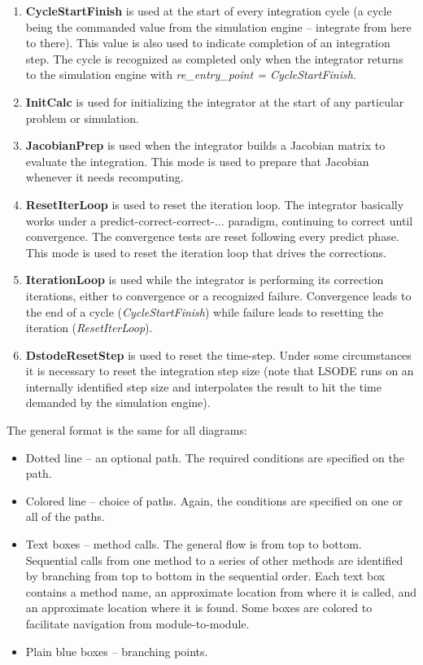 \begin{enumerate}
\item {\textbf{CycleStartFinish}} is used at the start of every integration
cycle (a
cycle being the commanded value from the simulation engine -- integrate from
here to there).  This value is also used to indicate completion of an
integration step.  The cycle is recognized as completed only when the
integrator
returns to the simulation engine with \textit{re\_entry\_point =
CycleStartFinish}.
\item {\textbf{InitCalc}} is used for initializing the integrator at the start
of any
particular problem or simulation.
\item {\textbf{JacobianPrep}} is used when the integrator builds a Jacobian
matrix to
evaluate the integration. This mode is used to prepare that Jacobian whenever
it needs recomputing.
\item {\textbf{ResetIterLoop}} is used to reset the iteration loop.  The
integrator
basically works under a predict-correct-correct-... paradigm, continuing to
correct until convergence.  The convergence tests are reset following every
predict phase. This mode is used to reset the iteration loop that drives the
corrections.
\item {\textbf{IterationLoop}} is used while the integrator is performing its
correction
iterations, either to convergence or a recognized failure.  Convergence leads
to the end of a cycle (\textit{CycleStartFinish}) while failure leads to
resetting the
iteration (\textit{ResetIterLoop}).
\item {\textbf{DstodeResetStep}} is used to reset the time-step.  Under some
circumstances it is necessary to reset the integration step size (note that
LSODE runs on an internally identified step size and interpolates the result
to hit the time demanded by the simulation engine).
\end{enumerate}


The general format is the same for all diagrams:
\begin{itemize}
\item Dotted line -- an optional path.  The required conditions are specified
on the path.
\item Colored line -- choice of paths.  Again, the conditions are specified on
one or all of the paths.
\item Text boxes -- method calls.  The general flow is from top to bottom.
Sequential calls from one method to a series of other methods are identified
by branching from top to bottom in the sequential order.  Each text box
contains a method name, an approximate location from where it is called, and
an approximate location where it is found.  Some boxes are colored to
facilitate navigation from module-to-module.
\item Plain blue boxes -- branching points.
\end{itemize}

